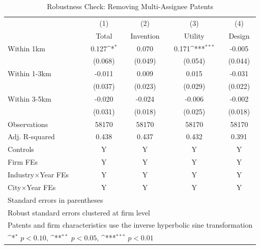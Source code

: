 \begin{table}[!htbp]\centering
\def\sym#1{\ifmmode^{#1}\else\(^{#1}\)\fi}
\caption{Robustness Check: Removing Multi-Assignee Patents}
\label{tab:RBnomulti}
\begin{tabular}{l*{4}{c}}
\toprule
            &\multicolumn{1}{c}{(1)}&\multicolumn{1}{c}{(2)}&\multicolumn{1}{c}{(3)}&\multicolumn{1}{c}{(4)}\\
            &\multicolumn{1}{c}{Total}&\multicolumn{1}{c}{Invention}&\multicolumn{1}{c}{Utility}&\multicolumn{1}{c}{Design}\\
\midrule
Within 1km  &       0.127\sym{*}  &       0.070         &       0.171\sym{***}&      -0.005         \\
            &     (0.068)         &     (0.049)         &     (0.054)         &     (0.044)         \\
\addlinespace
Within 1-3km&      -0.011         &       0.009         &       0.015         &      -0.031         \\
            &     (0.037)         &     (0.023)         &     (0.029)         &     (0.022)         \\
\addlinespace
Within 3-5km&      -0.020         &      -0.024         &      -0.006         &      -0.002         \\
            &     (0.031)         &     (0.018)         &     (0.025)         &     (0.018)         \\
\midrule
Observations&       58170         &       58170         &       58170         &       58170         \\
Adj. R-squared&       0.438         &       0.437         &       0.432         &       0.391         \\
Controls    &           Y         &           Y         &           Y         &           Y         \\
Firm FEs    &           Y         &           Y         &           Y         &           Y         \\
Industry$\times$Year FEs&           Y         &           Y         &           Y         &           Y         \\
City$\times$Year FEs&           Y         &           Y         &           Y         &           Y         \\
\bottomrule
\multicolumn{5}{l}{\footnotesize Standard errors in parentheses}\\
\multicolumn{5}{l}{\footnotesize Robust standard errors clustered at firm level}\\
\multicolumn{5}{l}{\footnotesize Patents and firm characteristics use the inverse hyperbolic sine transformation}\\
\multicolumn{5}{l}{\footnotesize \sym{*} \(p<0.10\), \sym{**} \(p<0.05\), \sym{***} \(p<0.01\)}\\
\end{tabular}
\end{table}